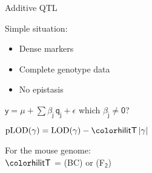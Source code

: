 \documentclass[aspectratio=169,12pt,t]{beamer}
\newcommand{\lod}{\text{LOD}}
\newcommand{\plod}{\text{pLOD}}
\begin{document}
\begin{frame}{Additive QTL}


\hfill \begin{minipage}{10in}

Simple situation:

\lolit
\begin{itemize}
\item Dense markers
\item Complete genotype data
\item No epistasis

\end{itemize}

\vspace{2cm}

\centerline{
$\mathsf{y  = \mu + \sum \beta_j \, q_j + \epsilon}$ \hspace{1cm}
       {\hilit which $\mathsf{\beta_j \ne 0}$?}
}

\vspace{2cm}

{\color{myyellow}
$\mathsf{ \plod(\gamma) = \lod(\gamma) -
    {\hilit T} \, |\gamma| }$
}

\vspace{2cm}

\begin{minipage}[t]{10in}
\vspace*{0mm}

For the mouse genome: \\[6pt]
\hspace*{0.5in} $\mathsf{\hilit T}$ = {} (BC) or {} (F$_{\mathsf{2}}$)
\end{minipage}

\end{minipage}




\end{frame}
\end{document}
